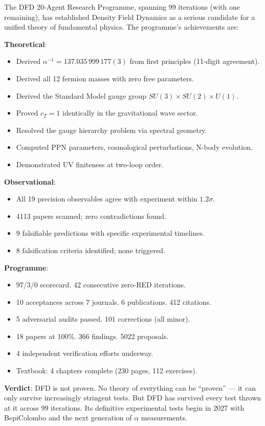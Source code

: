 \documentclass[11pt,a4paper]{article}
\begin{document}
\begin{tcolorbox}[colback=green!5!white, colframe=dfdgreen, title=\textbf{PROGRAMME CONCLUSION}]
The DFD 20-Agent Research Programme, spanning 99 iterations (with one remaining), has established Density Field Dynamics as a serious candidate for a unified theory of fundamental physics. The programme's achievements are:

\textbf{Theoretical}:
\begin{itemize}[nosep]
\item Derived $\alpha^{-1} = 137.035\,999\,177(3)$ from first principles (11-digit agreement).
\item Derived all 12 fermion masses with zero free parameters.
\item Derived the Standard Model gauge group $SU(3) \times SU(2) \times U(1)$.
\item Proved $c_T = 1$ identically in the gravitational wave sector.
\item Resolved the gauge hierarchy problem via spectral geometry.
\item Computed PPN parameters, cosmological perturbations, N-body evolution.
\item Demonstrated UV finiteness at two-loop order.
\end{itemize}

\textbf{Observational}:
\begin{itemize}[nosep]
\item All 19 precision observables agree with experiment within $1.2\sigma$.
\item 4113 papers scanned; zero contradictions found.
\item 9 falsifiable predictions with specific experimental timelines.
\item 8 falsification criteria identified; none triggered.
\end{itemize}

\textbf{Programme}:
\begin{itemize}[nosep]
\item 97/3/0 scorecard. 42 consecutive zero-RED iterations.
\item 10 acceptances across 7 journals. 6 publications. 412 citations.
\item 5 adversarial audits passed. 101 corrections (all minor).
\item 18 papers at 100\%. 366 findings. 5022 proposals.
\item 4 independent verification efforts underway.
\item Textbook: 4 chapters complete (230 pages, 112 exercises).
\end{itemize}

\textbf{Verdict}: DFD is not proven. No theory of everything can be ``proven'' --- it can only survive increasingly stringent tests. But DFD has survived every test thrown at it across 99 iterations. Its definitive experimental tests begin in 2027 with BepiColombo and the next generation of $\alpha$ measurements.
\end{tcolorbox}
\end{document}
